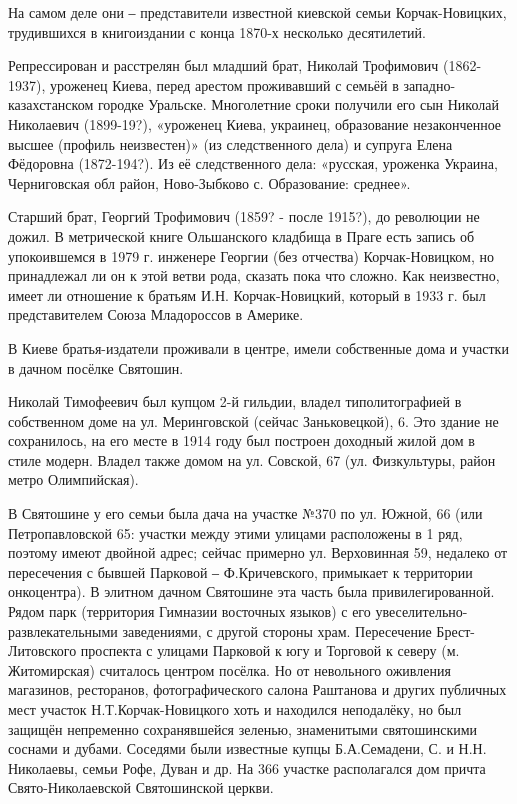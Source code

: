 На самом деле они ‒ представители известной киевской семьи Корчак-Новицких,
трудившихся в книгоиздании с конца 1870-х несколько десятилетий. 

Репрессирован и расстрелян был младший брат, Николай Трофимович (1862-1937),
уроженец Киева, перед арестом проживавший с семьёй в западно-казахстанском
городке Уральске. Многолетние сроки получили его сын Николай Николаевич
(1899-19?), «уроженец Киева, украинец, образование незаконченное высшее
(профиль неизвестен)» (из следственного дела) и супруга Елена Фёдоровна
(1872-194?). Из её следственного дела: «русская, уроженка Украина, Черниговская
обл район, Ново-Зыбково с. Образование: среднее».

Старший брат, Георгий Трофимович (1859? - после 1915?), до революции не дожил.
В метрической книге Ольшанского кладбища в Праге есть запись об упокоившемся в
1979 г. инженере Георгии (без отчества) Корчак-Новицком, но принадлежал ли он к
этой ветви рода, сказать пока что сложно. Как неизвестно, имеет ли отношение к
братьям И.Н. Корчак-Новицкий, который в 1933 г. был представителем Союза
Младороссов в Америке. 

В Киеве братья-издатели проживали в центре, имели собственные дома и участки в
дачном посёлке Святошин. 

Николай Тимофеевич был купцом 2-й гильдии, владел типолитографией в собственном
доме на ул. Меринговской (сейчас Заньковецкой), 6. Это здание не сохранилось,
на его месте в 1914 году был построен доходный жилой дом в стиле модерн.
Владел также домом на ул. Совской, 67 (ул. Физкультуры, район метро
Олимпийская). 

В Святошине у его семьи была дача на участке №370 по ул. Южной, 66 (или
Петропавловской 65: участки между этими улицами расположены в 1 ряд, поэтому
имеют двойной адрес; сейчас примерно ул. Верховинная 59, недалеко от
пересечения с бывшей Парковой ‒ Ф.Кричевского, примыкает к территории
онкоцентра). В элитном дачном Святошине эта часть была привилегированной. Рядом
парк (территория Гимназии восточных языков) с его
увеселительно-развлекательными заведениями, с другой стороны храм. Пересечение
Брест-Литовского проспекта с улицами Парковой к югу и Торговой  к северу (м.
Житомирская) считалось центром посёлка. Но от невольного оживления магазинов,
ресторанов, фотографического салона Раштанова и других публичных мест участок
Н.Т.Корчак-Новицкого хоть и находился неподалёку, но был защищён непременно
сохранявшейся зеленью, знаменитыми святошинскими соснами и дубами. Соседями
были известные купцы Б.А.Семадени, С. и Н.Н. Николаевы, семьи Рофе, Дуван и др.
На 366 участке располагался дом причта Свято-Николаевской Святошинской церкви. 

